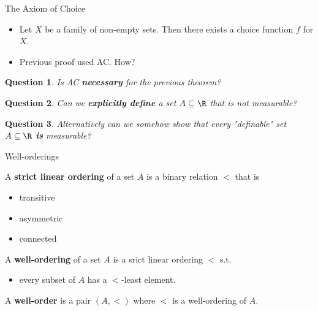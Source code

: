 \documentclass{beamer}
\newtheorem*{question}{Question}
\begin{document}
\begin{frame}{The Axiom of Choice}

\begin{itemize}
  \item Let $X$ be a family of non-empty sets. Then there exists a choice
  function $f$ for $X$.
  \item Previous proof used AC. How?
\end{itemize}

\begin{question}
Is AC \textbf{necessary} for the previous theorem?
\end{question}

\begin{question}
Can we \textbf{explicitly define} a set $A\subseteq \R$ that is not measurable?
\end{question}

\begin{question}
 Alternatively can we somehow show that every "definable" set
$A\subseteq \R$ \textbf{is} measurable?
\end{question}


\end{frame}

\begin{frame}{Well-orderings}

\begin{definition}
A \textbf{strict linear ordering} of a set $A$ is a binary relation $<$ that is

\begin{itemize}
  \item transitive
  \item asymmetric
  \item connected
\end{itemize}

\end{definition}

\begin{definition}
A \textbf{well-ordering} of a set $A$ is a srict linear ordering $<$ s.t.

\begin{itemize}
  \item every subset of $A$ has a $<$-least element.
\end{itemize}

\end{definition}

\begin{definition}
A \textbf{well-order} is a pair $(A, <)$ where $<$ is a well-ordering of $A$.
\end{definition}

\end{frame}
\end{document}
